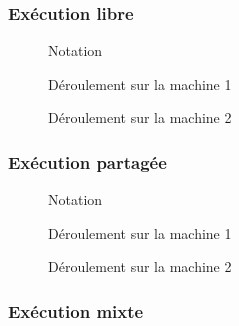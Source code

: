 \documentclass[]{beamer}
\begin{document}
\begin{frame}
\frametitle{Exécution libre}
\begin{figure}
    \centering
    \begin{tikzpicture}
    
    \end{tikzpicture}
    \caption{Notation}
\end{figure}
\begin{figure}
    \centering
    \begin{tikzpicture}
    
    \end{tikzpicture}
    \caption{Déroulement sur la machine 1}
\end{figure}
\begin{figure}
    \centering
    \begin{tikzpicture}
    
    \end{tikzpicture}
    \caption{Déroulement sur la machine 2}
\end{figure}
\end{frame}
\begin{frame}
\frametitle{Exécution partagée}
\begin{figure}
    \centering
    \begin{tikzpicture}
    
    \end{tikzpicture}
    \caption{Notation}
\end{figure}
\begin{figure}
    \centering
    \begin{tikzpicture}
    
    \end{tikzpicture}
    \caption{Déroulement sur la machine 1}
\end{figure}
\begin{figure}
    \centering
    \begin{tikzpicture}
    
    \end{tikzpicture}
    \caption{Déroulement sur la machine 2}
\end{figure}
\end{frame}
\begin{frame}
\frametitle{Exécution mixte}
\end{frame}
\end{document}
